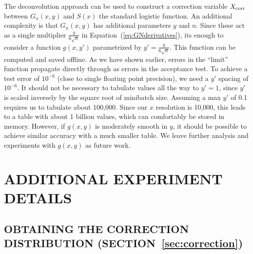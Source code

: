 \documentclass[letterpaper]{article}
\begin{document}
The deconvolution approach can be used to construct a correction variable
$X_{\rm corr}$ between $G_n(x,y)$ and $S(x)$ the standard logistic function. An
additional complexity is that $G_n(x,y)$ has additional parameters $y$ and $n$.
Since these act as a single multiplier $\frac{y}{6\sqrt{n}}$ in
Equation~(\ref{eq:GNderivatives}), its enough to consider a function $g(x,y')$
parametrized by $y'= \frac{y}{6\sqrt{n}}$. This function can be computed and
saved offline. As we have shown earlier, errors in the ``limit'' function
propagate directly through as errors in the acceptance test.  To achieve a test
error of $10^{-6}$ (close to single floating point precision), we need a $y'$
spacing of $10^{-6}$. It should not be necessary to tabulate values all the way to
$y'=1$, since $y'$ is scaled inversely by the square root of minibatch size.
Assuming a max $y'$ of 0.1 requires us to tabulate about 100,000.  Since our $x$
resolution is 10,000, this leads to a table with about 1 billion values, which
can comfortably be stored in memory.  However, if $g(x,y)$ is moderately smooth
in $y$, it should be possible to achieve similar accuracy with a much smaller
table. We leave further analysis and experiments with $g(x,y)$ as future work.





\section{ADDITIONAL EXPERIMENT DETAILS}\label{app:experiments}

\subsection{OBTAINING THE CORRECTION DISTRIBUTION (SECTION~\ref{sec:correction})}\label{app:correction}
\end{document}
